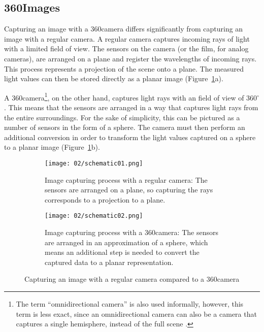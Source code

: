\subsection{360\degree Images}\label{subsec:fundamentals_360}
Capturing an image with a 360\degree camera differs significantly from capturing an image with a regular camera. A regular camera captures incoming rays of light with a limited field of view. The sensors on the camera (or the film, for analog cameras), are arranged on a plane and register the wavelengths of incoming rays. This process represents a projection of the scene onto a plane. The measured light values can then be stored directly as a planar image (Figure~\ref{fig:cameras}a).


A 360\degree camera\footnote{The term ``omnidirectional camera'' is also used informally, however, this term is less exact, since an omnidirectional camera can also be a camera that captures a single hemisphere, instead of the full scene \cite{omnidir}.}, on the other hand, captures light rays with an field of view of 360$^{\circ}$. This means that the sensors are arranged in a way that captures light rays from the entire surroundings. For the sake of simplicity, this can be pictured as a number of sensors in the form of a sphere\footnotemark. The camera must then perform an additional conversion in order to transform the light values captured on a sphere to a planar image (Figure~\ref{fig:cameras}b). \cite{omnidir}


\begin{figure}
\centering
    \begin{subfigure}[t]{0.9\textwidth}            
            \centering
            \texttt{[image: 02/schematic01.png]}
            \caption{Image capturing process with a regular camera: The sensors are arranged on a plane, so capturing the rays corresponds to a projection to a plane.}
    \end{subfigure}
    \begin{subfigure}[t]{0.9\textwidth}
            \centering
            \texttt{[image: 02/schematic02.png]}
            \caption{Image capturing process with a 360\degree camera: The sensors are arranged in an approximation of a sphere, which means an additional step is needed to convert the captured data to a planar representation.}
    \end{subfigure}
    \caption{Capturing an image with a regular camera compared to a 360\degree camera}\label{fig:cameras}
\end{figure}

